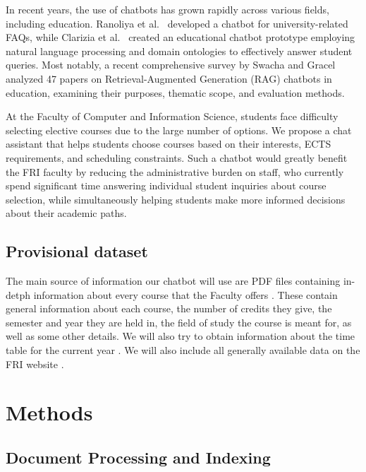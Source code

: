 \documentclass[fleqn,moreauthors,10pt]{ds_report}
\begin{document}
In recent years, the use of chatbots has grown rapidly across various fields, including education. Ranoliya et al.~\cite{ranoliya2017chatbot} developed a chatbot for university-related FAQs, while Clarizia et al.~\cite{clarizia2018chatbot} created an educational chatbot prototype employing natural language processing and domain ontologies to effectively answer student queries. Most notably, a recent comprehensive survey by Swacha and Gracel~\cite{swacha2025rag} analyzed 47 papers on Retrieval-Augmented Generation (RAG) chatbots in education, examining their purposes, thematic scope, and evaluation methods.

At the Faculty of Computer and Information Science, students face difficulty selecting elective courses due to the large number of options. We propose a chat assistant that helps students choose courses based on their interests, ECTS requirements, and scheduling constraints. Such a chatbot would greatly benefit the FRI faculty by reducing the administrative burden on staff, who currently spend significant time answering individual student inquiries about course selection, while simultaneously helping students make more informed decisions about their academic paths.

\subsection*{Provisional dataset}
The main source of information our chatbot will use are PDF files containing in-detph information about every course that the Faculty offers \cite{uni_fri_zbornik, vss_fri_zbornik}. These contain general information about each course, the number of credits they give, the semester and year they are held in, the field of study the course is meant for, as well as some other details. We will also try to obtain information about the time table for the current year \cite{urnik_fri}. We will also include all generally available data on the FRI website \cite{ul_fri}.


\section*{Methods}

\subsection*{Document Processing and Indexing}
\end{document}
